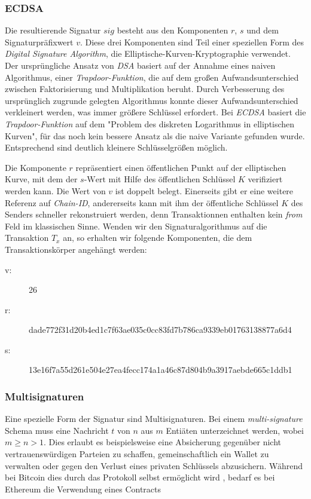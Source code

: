 \documentclass[runningheads]{llncs}
\begin{document}
\subsubsection{ECDSA}
\label{ecdsa}
Die resultierende Signatur $ sig $ besteht aus den Komponenten $ r $, $ s $ und dem Signaturpräfixwert $ v $.  Diese drei Komponenten sind Teil einer speziellen Form des \textit{Digital Signature Algorithm}, die Elliptische-Kurven-Kryptographie verwendet. Der ursprüngliche Ansatz von \textit{DSA} basiert auf der Annahme eines naiven Algorithmus, einer \textit{Trapdoor-Funktion}, die auf dem großen Aufwandsunterschied zwischen Faktorisierung und Multiplikation beruht. Durch Verbesserung des ursprünglich zugrunde gelegten Algorithmus konnte dieser Aufwandsunterschied verkleinert werden, was immer größere Schlüssel erfordert. Bei \textit{ECDSA} basiert die \textit{Trapdoor-Funktion} auf dem "Problem des diskreten Logarithmus in elliptischen Kurven", für das noch kein bessere Ansatz als die naive Variante gefunden wurde. Entsprechend sind deutlich kleinere Schlüsselgrößen möglich. \cite{noauthor_elliptic_2020}

Die Komponente $ r $ repräsentiert einen öffentlichen Punkt auf der elliptischen Kurve, mit dem der $ s\text{-Wert} $ mit Hilfe des öffentlichen Schlüssel $ K $ verifiziert werden kann. Die Wert von $ v $ ist doppelt belegt. Einerseits gibt er eine weitere Referenz auf \textit{Chain-ID}, andererseits kann mit ihm der öffentliche Schlüssel $ K $ des Senders schneller rekonstruiert werden, denn Transaktionnen enthalten kein \textit{from} Feld im klassischen Sinne. Wenden wir den Signaturalgorithmus auf die Transaktion $ T_x $ an, so erhalten wir folgende Komponenten, die dem Transaktionskörper angehängt werden: \cite[S. 114 ff.]{antonopoulos_mastering_2019}

\begin{description}
  \item[v:] 26
  \item [r:] dade772f31d20b4ed1c7f63ae035c0cc83fd7b786ca9339eb01763138877a6d4
  \item[s:] 13e16f7a55d261e504e27ea4fecc174a1a46c87d804b9a3917aebde665c1ddb1
\end{description}

\subsubsection{Multisignaturen}
Eine spezielle Form der Signatur sind Multisignaturen. Bei einem \textit{multi-signature} Schema muss eine Nachricht $ t $ von $ n $ aus $ m $ Entiäten unterzeichnet werden, wobei $ m \geq n > 1 $. \cite[S. 2]{hutchison_identity-based_2006} Dies erlaubt es beispielsweise eine Absicherung gegenüber nicht vertrauenswürdigen Parteien zu schaffen, gemeinschaftlich ein Wallet zu verwalten oder gegen den Verlust eines privaten Schlüssels abzusichern. Während bei Bitcoin dies durch das Protokoll selbst ermöglicht wird \cite{noauthor_multisignature_nodate}, bedarf es bei Ethereum die Verwendung eines Contracts \cite{noauthor_frequently_nodate}
\end{document}

